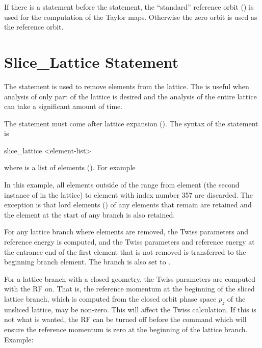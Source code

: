 {{{{{If there is a  statement before the  statement, the
``standard'' reference orbit () is used for the computation of the Taylor
maps. Otherwise the zero orbit is used as the reference orbit.

\section{Slice_Lattice Statement}
\label{s:slice}

The  statement is used to remove elements from the lattice. The 
is useful when analysis of only part of the lattice is desired and the analysis of the entire
lattice can take a significant amount of time.

The  statement must come after lattice expansion (). The syntax of
the  statement is
\begin{example}
  slice_lattice <element-list>
\end{example}
where  is a list of elements (). For example
In this example, all elements outside of the range from element  (the second instance of
 in the lattice) to element with index number 357 are discarded. The exception is that lord
elements () of any elements that remain are retained and the 
element at the start of any branch is also retained.

For any lattice branch where elements are removed, the Twiss parameters and reference energy is
computed, and the Twiss parameters and reference energy at the entrance end of the first element
that is not removed is transferred to the beginning branch element. The branch  is also
set to .

For a lattice branch with a closed geometry, the Twiss parameters are computed with the RF on. That
is, the reference momentum at the beginning of the sliced lattice branch, which is computed from the
closed orbit phase space $p_z$ of the unsliced lattice, may be non-zero. This will affect the Twiss
calculation. If this is not what is wanted, the RF can be turned off before the 
command which will ensure the reference momentum is zero at the beginning of the lattice
branch. Example:

}}}}}
